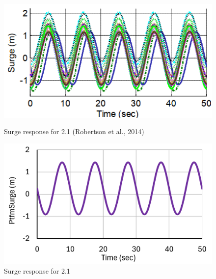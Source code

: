 \documentclass[a4paper]{article}
\begin{document}
\begin{figure}[H]
    \begin{minipage}{0.49\textwidth}
        \centering
        \includegraphics[width=1\textwidth]{2.1_surge.png}
        \caption{\small Surge response for 2.1 (Robertson et al., 2014)}
        \label{fig:2.1_surge}
    \end{minipage}
    \hfill
    \begin{minipage}{0.5\textwidth}
        \centering
        \vspace{-0.6cm}
        \includegraphics[width=1\textwidth]{2.1_surge_mine.png}
        \caption{\small Surge response for 2.1}
        \label{fig:2.1_surge_mine}
    \end{minipage}
\end{figure}
\end{document}
